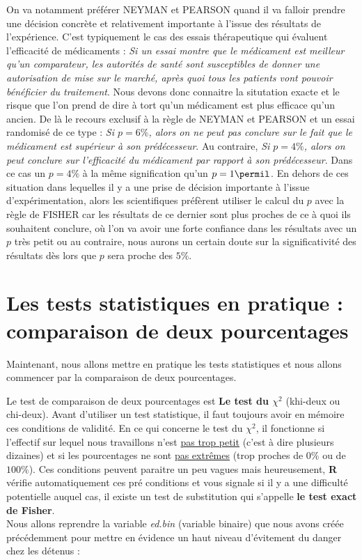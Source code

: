 On va notamment préférer NEYMAN et PEARSON quand il va falloir prendre une décision concrète et relativement importante à l'issue des résultats de l'expérience. C'est typiquement le cas des essais thérapeutique qui évaluent l'efficacité de médicaments : \textit{Si un essai montre que le médicament est meilleur qu'un comparateur, les autorités de santé sont susceptibles de donner une autorisation de mise sur le marché, après quoi tous les patients vont pouvoir bénéficier du traitement}. Nous devons donc connaitre la situtation exacte et le risque que l'on prend de dire à tort qu'un médicament est plus efficace qu'un ancien. De là le recours exclusif à la règle de NEYMAN et PEARSON et un essai randomisé de ce type : \textit{Si $p=6\%$, alors on ne peut pas conclure sur le fait que le médicament est supérieur à son prédécesseur}. Au contraire, \textit{Si $p=4\%$, alors on peut conclure sur l'efficacité du médicament par rapport à son prédécesseur}. Dans ce cas un $p=4\%$ à la même signification qu'un $p=1\permil$.\newline
En dehors de ces situation dans lequelles il y a une prise de décision importante à l'issue d'expérimentation, alors les scientifiques préfèrent utiliser le calcul du $p$ avec la règle de FISHER car les résultats de ce dernier sont plus proches de ce à quoi ils souhaitent conclure, où l'on va avoir une forte confiance dans les résultats avec un $p$ très petit ou au contraire, nous aurons un certain doute sur la significativité des résultats dès lors que $p$ sera proche des $5\%$.
\newpage
\section{Les tests statistiques en pratique : comparaison de deux pourcentages}

Maintenant, nous allons mettre en pratique les tests statistiques et nous allons commencer par la comparaison de deux pourcentages.\newline

Le test de comparaison de deux pourcentages est \textbf{Le test du $\chi^{2}$} (khi-deux ou chi-deux).\newline
Avant d'utiliser un test statistique, il faut toujours avoir en mémoire ces conditions de validité. En ce qui concerne le test du $\chi^{2}$, il fonctionne si l'effectif sur lequel nous travaillons n'est \underline{pas trop petit} (c'est à dire plusieurs dizaines) et si les pourcentages ne sont \underline{pas extrêmes} (trop proches de $0\%$ ou de $100\%$). Ces conditions peuvent paraitre un peu vagues mais heureusement, \textbf{R} vérifie automatiquement ces pré conditions et vous signale si il y a une difficulté potentielle auquel cas, il existe un test de substitution qui s'appelle \textbf{le test exact de Fisher}.\newline
\\
Nous allons reprendre la variable \textit{ed.bin} (variable binaire) que nous avons créée précédemment pour mettre en évidence un haut niveau d'évitement du danger chez les détenus :

